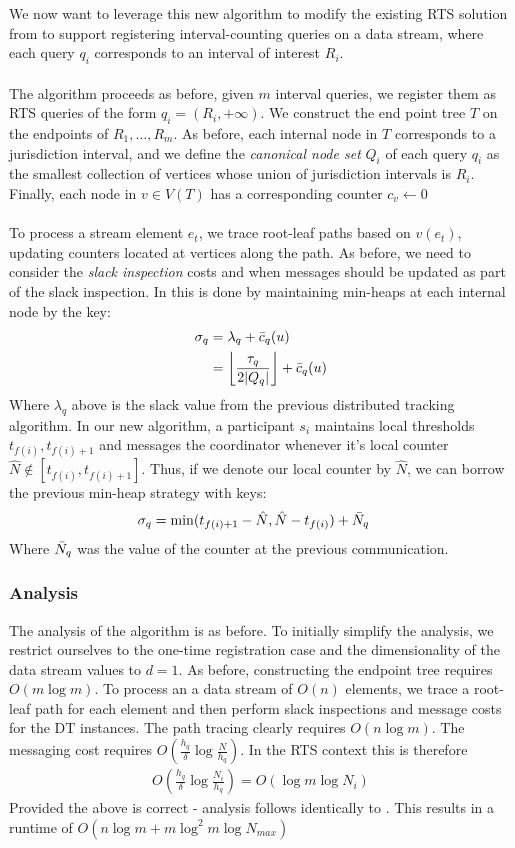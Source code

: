 \documentclass{article}
\begin{document}
We now want to leverage this new algorithm to modify the existing RTS solution from \cite{Gan2016} to support registering interval-counting queries on a data stream, where each query $q_i$ corresponds to an interval of interest $R_i$.\\
\\
The algorithm proceeds as before, given $m$ interval queries, we register them as RTS queries of the form $q_i = (R_i, +\infty)$. We construct the end point tree $T$ on the endpoints of $R_1,\dots,R_m$. As before, each internal node in $T$ corresponds to a jurisdiction interval, and we define the \textit{canonical node set} $Q_i$ of each query $q_i$ as the smallest collection of vertices whose union of jurisdiction intervals is $R_i$. Finally, each node in $v\in V(T)$ has a corresponding counter $c_v \leftarrow 0$\\
\\
To process a stream element $e_t$, we trace root-leaf paths based on $v(e_t)$, updating counters located at vertices along the path. As before, we need to consider the \textit{slack inspection} costs and when messages should be updated as part of the slack inspection. In \cite{Gan2016} this is done by maintaining min-heaps at each internal node by the key:
\begin{align*}
    \sigma_q &= \lambda_q + \Bar{c}_q(u) \\
              &= \left\lfloor \frac{\tau_q}{2|Q_q|}\right\rfloor + \Bar{c}_{q}(u)
\end{align*}
Where $\lambda_q$ above is the slack value from the previous distributed tracking algorithm. In our new algorithm, a participant $s_i$ maintains local thresholds $t_{f(i)}, t_{f(i)+1}$ and messages the coordinator whenever it's local counter $\hat{N}\notin [t_{f(i)}, t_{f(i)+1}]$. Thus, if we denote our local counter by $\hat{N}$, we can borrow the previous min-heap strategy with keys: 
\begin{align*}
    \sigma_q &= \min(t_{f(i)+1}-\hat{N}, \hat{N}-t_{f(i)}) + \Bar{N}_q 
\end{align*}
Where $\Bar{N}_q$ was the value of the counter at the previous communication.


\subsubsection*{Analysis}
The analysis of the algorithm is as before. To initially simplify the analysis, we restrict ourselves to the one-time registration case and the dimensionality of the data stream values to $d=1$. As before, constructing the endpoint tree requires $O(m\log m)$. To process an a data stream of $O(n)$ elements, we trace a root-leaf path for each element and then perform slack inspections and message costs for the DT instances. The path tracing clearly requires $O(n\log m)$. The messaging cost requires $O(\frac{h_q}{\delta}\log \frac{N}{h_q})$. In the RTS context this is therefore 
\begin{align}
    O\left(\frac{h_q}{\delta}\log \frac{N_i}{h_q}\right) = O(\log m \log N_{i})
\end{align}
Provided the above is correct - analysis follows identically to \cite{Gan2016}. This results in a runtime of $O(n\log m + m\log^2 m\log N_{max})$
\end{document}
